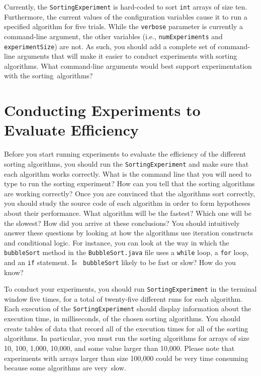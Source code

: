 Currently, the {\tt SortingExperiment} is hard-coded to sort {\tt int} arrays of size ten. Furthermore, the current
values of the configuration variables cause it to run a specified algorithm for five trials.  While the {\tt verbose}
parameter is currently a command-line argument, the other variables (i.e., {\tt numExperiments} and {\tt
  experimentSize}) are not.  As such, you should add a complete set of command-line arguments that will make it easier
to conduct experiments with sorting algorithms. What command-line arguments would best support experimentation with
the \mbox{sorting algorithms}?

\section*{Conducting Experiments to Evaluate Efficiency}

Before you start running experiments to evaluate the efficiency of the different sorting algorithms, you should run the
{\tt SortingExperiment} and make sure that each algorithm works correctly.  What is the command line that you will need
to type to run the sorting experiment? How can you tell that the sorting algorithms are working correctly? Once you are
convinced that the algorithms sort correctly, you should study the source code of each algorithm in order to form
hypotheses about their performance.  What algorithm will be the fastest? Which one will be the slowest? How did you
arrive at these conclusions? You should intuitively answer these questions by looking at how the algorithms use
iteration constructs and conditional logic. For instance, you can look at the way in which the {\tt bubbleSort} method
in the {\tt BubbleSort.java} file uses a {\tt while} loop, a {\tt for} loop, and an {\tt if} statement. Is {\tt
bubbleSort} likely to be fast or slow? How do you know?

To conduct your experiments, you should run {\tt SortingExperiment} in the terminal window five times, for a total of
twenty-five different runs for each algorithm. Each execution of the {\tt SortingExperiment} should display information
about the execution time, in milliseconds, of the chosen sorting algorithms. You should create tables of data that
record all of the execution times for all of the sorting algorithms. In particular, you must run the sorting algorithms
for arrays of size 10, 100, 1,000, 10,000, and some value larger than 10,000. Please note that experiments
with arrays larger than size 100,000 could be very time consuming because some algorithms are \mbox{very slow}.

